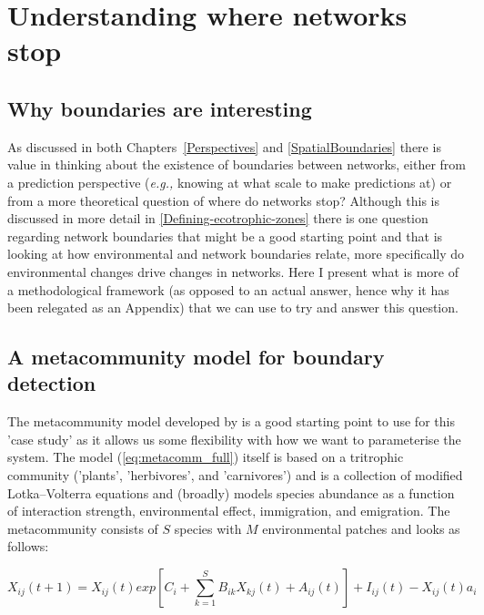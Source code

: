 \anglais
\doublespacing
\chapter{Understanding where networks stop}\label{supp:boundaries}
\begin{refsection}

\section{Why boundaries are interesting}

As discussed in both Chapters~\ref{Perspectives} and \ref{SpatialBoundaries}
there is value in thinking about the existence of boundaries between networks, either from a prediction perspective (\emph{e.g.,} knowing at what scale to make predictions at) or from a more theoretical question of where do networks stop? Although this is discussed in more detail in \autoref{Defining-ecotrophic-zones} there is one question regarding network boundaries that might be a good starting point and that is looking at how environmental and network boundaries relate, more specifically do environmental changes drive changes in networks. Here I present what is more of a methodological framework (as opposed to an actual answer, hence why it has been relegated as an Appendix) that we can use to try and answer this question.

\section{A metacommunity model for boundary detection}

The metacommunity model developed by \cite{Thompson2017Dispersal} is a good starting point to use for this 'case study' as it allows us some flexibility with how we want to parameterise the system. The model (\ref{eq:metacomm_full}) itself is based on a tritrophic community ('plants', 'herbivores', and 'carnivores') and is a collection of modified Lotka–Volterra equations and (broadly) models species abundance as a function of interaction strength, environmental effect, immigration, and emigration. The metacommunity consists of $S$ species with $M$ environmental patches and looks as follows:

\begin{equation} \label{eq:metacomm_full}
X_{ij}(t+1)=X_{ij}(t)exp\left[C_{i} + \sum_{k=1}^{S}B_{ik}X_{kj}(t)+A_{ij}(t)\right]+I_{ij}(t)-X_{ij}(t)a_{i}
\end{equation}


\end{refsection}
